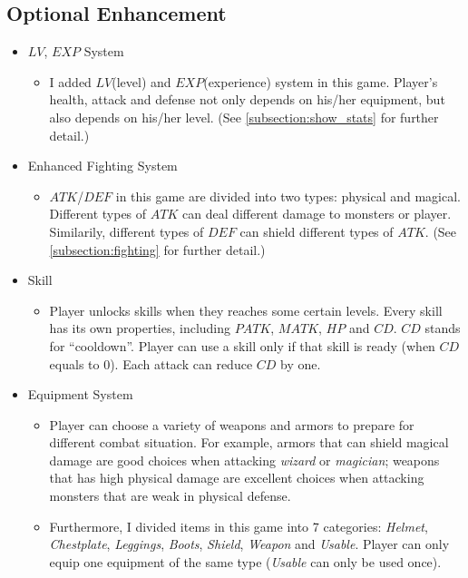 \documentclass{article}
\begin{document}
    
    \subsection{Optional Enhancement}
    \begin{itemize}
        \item $LV$, $EXP$ System
        \begin{itemize}
            \item I added $LV$(level) and $EXP$(experience) system in this game. Player's health, attack and defense not only depends on his/her equipment, but also depends on his/her level. (See \ref{subsection:show_stats} for further detail.)
        \end{itemize}
        \item Enhanced Fighting System
        \begin{itemize}
            \item $ATK$/$DEF$ in this game are divided into two types: physical and magical. Different types of $ATK$ can deal different damage to monsters or player. Similarily, different types of $DEF$ can shield different types of $ATK$. (See \ref{subsection:fighting} for further detail.)
        \end{itemize}
        \item Skill
        \begin{itemize}
            \item Player unlocks skills when they reaches some certain levels. Every skill has its own properties, including $PATK$, $MATK$, $HP$ and $CD$. $CD$ stands for ``cooldown''. Player can use a skill only if that skill is ready (when $CD$ equals to 0). Each attack can reduce $CD$ by one.
        \end{itemize}
        \item Equipment System
        \begin{itemize}
            \item Player can choose a variety of weapons and armors to prepare for different combat situation. For example, armors that can shield magical damage are good choices when attacking \textit{wizard} or \textit{magician}; weapons that has high physical damage are excellent choices when attacking monsters that are weak in physical defense.
            \item Furthermore, I divided items in this game into 7 categories:  \textit{Helmet}, \textit{Chestplate}, \textit{Leggings}, \textit{Boots}, \textit{Shield}, \textit{Weapon} and \textit{Usable}. Player can only equip one equipment of the same type (\textit{Usable} can only be used once).

\end{itemize}
\end{itemize}
\end{document}
